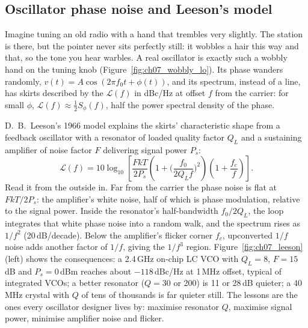 \subsection{Oscillator phase noise and Leeson's model}

Imagine tuning an old radio with a hand that trembles very slightly. The station is there, but the
pointer never sits perfectly still: it wobbles a hair this way and that, so the tone you hear warbles.
A real oscillator is exactly such a wobbly hand on the tuning knob (Figure~\ref{fig:ch07_wobbly_lo}).
Its phase wanders randomly, $v(t)=A\cos(2\pi f_0t+\phi(t))$, and its spectrum, instead of a line, has
skirts described by the  $\mathcal{L}(f)$ in dBc/Hz at offset $f$
from the carrier: for small $\phi$, $\mathcal L(f)\approx\tfrac12S_\phi(f)$, half the power spectral
density of the phase.


D.~B.~Leeson's 1966 model explains the skirts' characteristic shape from a feedback oscillator with a
resonator of loaded quality factor $Q_L$ and a sustaining amplifier of noise factor $F$ delivering
signal power $P_s$:
\begin{equation}
\mathcal L(f)=10\log_{10}\left[\frac{FkT}{2P_s}\left(1+\Big(\frac{f_0}{2Q_Lf}\Big)^2\right)\left(1+\frac{f_c}{f}\right)\right].
\label{eq:ch07:leeson}
\end{equation}
Read it from the outside in. Far from the carrier the phase noise is flat at $FkT/2P_s$: the
amplifier's white noise, half of which is phase modulation, relative to the signal power. Inside the
resonator's half-bandwidth $f_0/2Q_L$, the loop integrates that white phase noise into a random walk, and
the spectrum rises as $1/f^2$ (20\,dB/decade). Below the amplifier's flicker corner $f_c$, upconverted
$1/f$ noise adds another factor of $1/f$, giving the $1/f^3$ region. Figure~\ref{fig:ch07_leeson} (left)
shows the consequences: a 2.4\,GHz on-chip LC VCO with $Q_L=8$, $F=15$\,dB and $P_s=0$\,dBm reaches about
$-118$\,dBc/Hz at 1\,MHz offset, typical of integrated VCOs; a better resonator ($Q=30$ or 200) is
11 or 28\,dB quieter; a 40\,MHz crystal with $Q$ of tens of thousands is far quieter still. The lessons are
the ones every oscillator designer lives by: maximise resonator $Q$, maximise signal power, minimise
amplifier noise and flicker.

